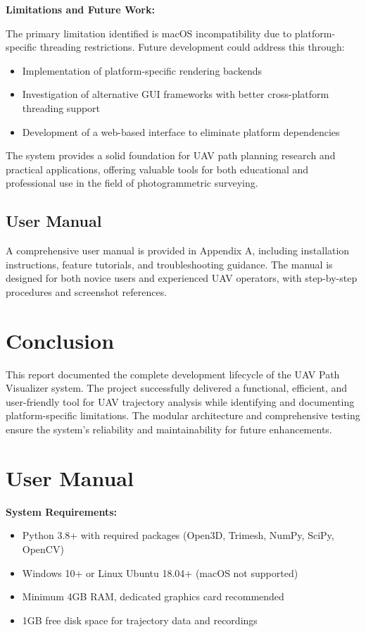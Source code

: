 \documentclass[11pt,a4paper]{article}
\begin{document}
\textbf{Limitations and Future Work:}

The primary limitation identified is macOS incompatibility due to platform-specific threading restrictions. Future development could address this through:
\begin{itemize}
\item Implementation of platform-specific rendering backends
\item Investigation of alternative GUI frameworks with better cross-platform threading support
\item Development of a web-based interface to eliminate platform dependencies
\end{itemize}

The system provides a solid foundation for UAV path planning research and practical applications, offering valuable tools for both educational and professional use in the field of photogrammetric surveying.

\subsection{User Manual}
\label{ss:user-manual}

A comprehensive user manual is provided in Appendix A, including installation instructions, feature tutorials, and troubleshooting guidance. The manual is designed for both novice users and experienced UAV operators, with step-by-step procedures and screenshot references.

\section{Conclusion}
\label{sec:conclusion}

This report documented the complete development lifecycle of the UAV Path Visualizer system. The project successfully delivered a functional, efficient, and user-friendly tool for UAV trajectory analysis while identifying and documenting platform-specific limitations. The modular architecture and comprehensive testing ensure the system's reliability and maintainability for future enhancements.

\appendix

\section{User Manual}

\textbf{System Requirements:}
\begin{itemize}
\item Python 3.8+ with required packages (Open3D, Trimesh, NumPy, SciPy, OpenCV)
\item Windows 10+ or Linux Ubuntu 18.04+ (macOS not supported)
\item Minimum 4GB RAM, dedicated graphics card recommended
\item 1GB free disk space for trajectory data and recordings
\end{itemize}
\end{document}
